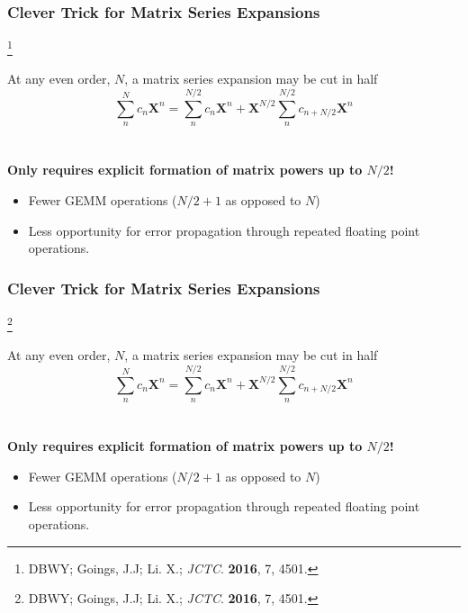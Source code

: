 \documentclass{beamer}
\newcommand\blfootnote[1]{%
  \begingroup
  \renewcommand\thefootnote{}\footnote{#1}%
  \addtocounter{footnote}{-1}%
  \endgroup
}
\begin{document}
\begin{frame}
\frametitle{Clever Trick for Matrix Series Expansions}
\blfootnote{DBWY; Goings, J.J; Li. X.; \emph{JCTC}. \textbf{2016}, 7, 4501.}

At any even order, $N$,  a matrix series expansion may be cut in half
\begin{equation*}
\sum_n^N c_n \mathbf{X}^n = \sum_n^{N/2} c_n \mathbf{X}^n + \mathbf{X}^{N/2}\sum_n^{N/2} c_{n+N/2}\mathbf{X}^n
\end{equation*}
~\\
~\\
\color{white}
{ \bf
Only requires explicit formation of matrix powers up to $N/2$!
}
\begin{itemize}
  \color{white}
  \item[\color{white}] Fewer GEMM operations ($N/2 + 1$ as opposed to $N$)
  \item[\color{white}] Less opportunity for error propagation through repeated floating point operations.
\end{itemize}
\end{frame}

\begin{frame}
\frametitle{Clever Trick for Matrix Series Expansions}
\blfootnote{DBWY; Goings, J.J; Li. X.; \emph{JCTC}. \textbf{2016}, 7, 4501.}

At any even order, $N$,  a matrix series expansion may be cut in half
\begin{equation*}
\sum_n^N c_n \mathbf{X}^n = \sum_n^{N/2} c_n \mathbf{X}^n + \mathbf{X}^{N/2}\sum_n^{N/2} c_{n+N/2}\mathbf{X}^n
\end{equation*}
~\\
~\\
{ \bf
Only requires explicit formation of matrix powers up to $N/2$!
}
\begin{itemize}
  \color{white}
  \item[\color{white}] Fewer GEMM operations ($N/2 + 1$ as opposed to $N$)
  \item[\color{white}] Less opportunity for error propagation through repeated floating point operations.
\end{itemize}
\end{frame}
\end{document}
